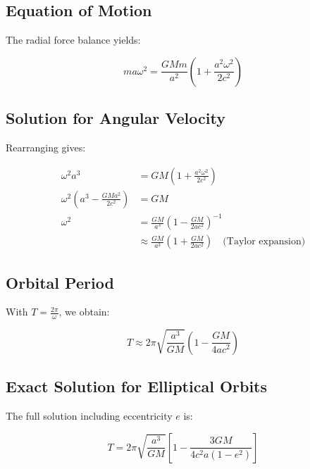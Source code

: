 \subsection*{Equation of Motion}
The radial force balance yields:

\begin{equation}
m a \omega^2 = \frac{GMm}{a^2}\left(1 + \frac{a^2 \omega^2}{2c^2}\right)
\end{equation}

\subsection*{Solution for Angular Velocity}
Rearranging gives:

\begin{align}
\omega^2 a^3 &= GM \left(1 + \frac{a^2 \omega^2}{2c^2}\right) \\
\omega^2 \left(a^3 - \frac{GM a^2}{2c^2}\right) &= GM \\
\omega^2 &= \frac{GM}{a^3} \left(1 - \frac{GM}{2a c^2}\right)^{-1} \\
&\approx \frac{GM}{a^3} \left(1 + \frac{GM}{2a c^2}\right) \quad \text{(Taylor expansion)}
\end{align}

\subsection*{Orbital Period}
With \( T = \frac{2\pi}{\omega} \), we obtain:

\begin{equation}
T \approx 2\pi \sqrt{\frac{a^3}{GM}} \left(1 - \frac{GM}{4a c^2}\right)
\end{equation}

\subsection*{Exact Solution for Elliptical Orbits}
The full solution including eccentricity \( e \) is:

\begin{equation}
\boxed{T = 2\pi \sqrt{\frac{a^3}{GM}} \left[1 - \frac{3GM}{4c^2 a(1-e^2)}\right]}
\end{equation}


